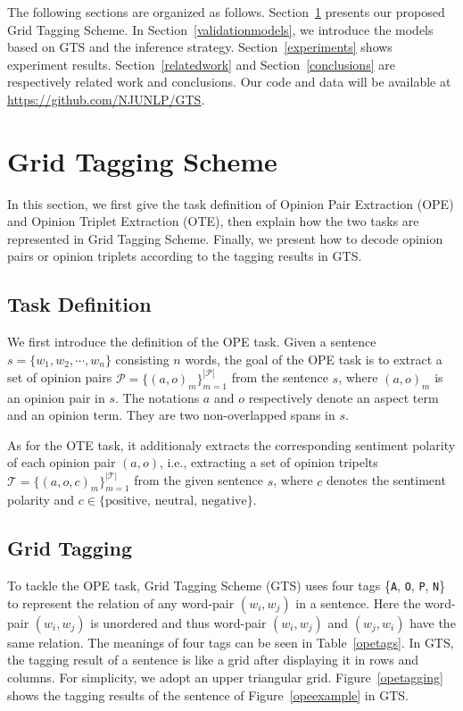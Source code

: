 \documentclass[11pt,a4paper]{article}
\begin{document}
The following sections are organized as follows. Section~\ref{gridtaggingscheme} presents our proposed Grid Tagging Scheme. In Section~\ref{validationmodels}, we introduce the models based on GTS and the inference strategy. Section~\ref{experiments} shows experiment results. Section~\ref{relatedwork} and Section~\ref{conclusions} are respectively related work and conclusions. Our code and data will be available at \url{https://github.com/NJUNLP/GTS}.


\section{Grid Tagging Scheme}
\label{gridtaggingscheme}
In this section, we first give the task definition of Opinion Pair Extraction (OPE) and Opinion Triplet Extraction (OTE), then explain how the two tasks are represented in Grid Tagging Scheme. Finally, we present how to decode opinion pairs or opinion triplets according to the tagging results in GTS.

\subsection{Task Definition}
We first introduce the definition of the OPE task. Given a sentence $s=\{w_1, w_2, \cdots, w_n\}$ consisting $n$ words, the goal of the OPE task is to extract a set of opinion pairs $\mathcal{P}=\{(a, o)_m\}_{m=1}^{|\mathcal{P}|}$ from the sentence $s$, where $(a, o)_m$ is an opinion pair in $s$. The notations $a$ and $o$ respectively denote an aspect term and an opinion term. They are two non-overlapped spans in $s$.

As for the OTE task, it additionaly extracts the corresponding sentiment polarity of each opinion pair $(a, o)$, i.e., extracting a set of opinion tripelts $\mathcal{T}=\{(a, o, c)_m\}_{m=1}^{|\mathcal{T}|}$ from the given sentence $s$, where $c$ denotes the sentiment polarity and $c\in\{\text{positive, neutral, negative}\}$.

\subsection{Grid Tagging}
\label{gridtagging}

To tackle the OPE task, Grid Tagging Scheme (GTS) uses four tags \{\texttt{A}, \texttt{O}, \texttt{P}, \texttt{N}\} to represent the relation of any word-pair $(w_i, w_j)$ in a sentence. Here the word-pair $(w_i, w_j)$ is unordered and thus word-pair $(w_i, w_j)$ and $(w_j, w_i)$ have the same relation. The meanings of four tags can be seen in Table~\ref{opetags}. In GTS, the tagging result of a sentence is like a grid after displaying it in rows and columns. For simplicity, we adopt an upper triangular grid. Figure~\ref{opetagging} shows the tagging results of the sentence of Figure~\ref{opeexample} in GTS.
\end{document}
